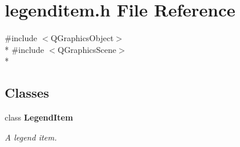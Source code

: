 \section{legenditem.\+h File Reference}
\label{items_2legenditem_8h}
{\ttfamily \#include $<$Q\+Graphics\+Object$>$}\\*
{\ttfamily \#include $<$Q\+Graphics\+Scene$>$}\\*
\subsection*{Classes}
\begin{DoxyCompactItemize}
\item 
class {\bf Legend\+Item}
\begin{DoxyCompactList}\small\item\em A legend item. \end{DoxyCompactList}\end{DoxyCompactItemize}
